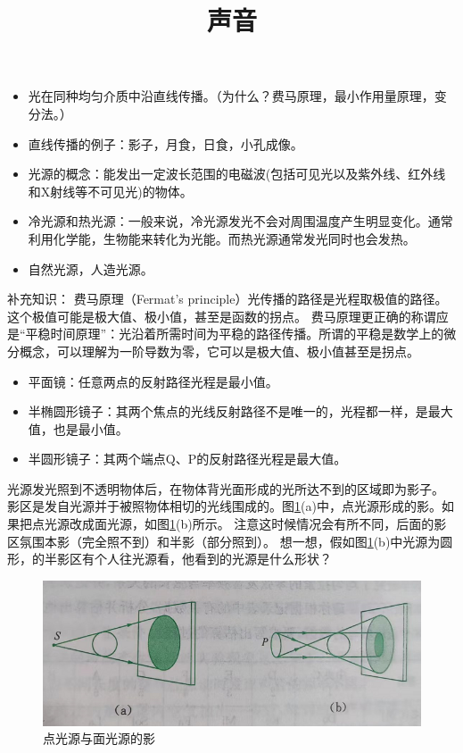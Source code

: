 \documentclass[windows,csize4, answers]{BHCexam}
\title{声音}
\begin{document}
\maketitle

\begin{groups}
    \begin{itemize}
        \item 光在同种均匀介质中沿直线传播。（为什么？费马原理，最小作用量原理，变分法。）
        \item 直线传播的例子：影子，月食，日食，小孔成像。
        \item 光源的概念：能发出一定波长范围的电磁波(包括可见光以及紫外线、红外线和X射线等不可见光)的物体。
        \item 冷光源和热光源：一般来说，冷光源发光不会对周围温度产生明显变化。通常利用化学能，生物能来转化为光能。而热光源通常发光同时也会发热。
        \item 自然光源，人造光源。
    \end{itemize}

    补充知识： 费马原理（Fermat's principle）光传播的路径是光程取极值的路径。这个极值可能是极大值、极小值，甚至是函数的拐点。
    费马原理更正确的称谓应是“平稳时间原理”：光沿着所需时间为平稳的路径传播。所谓的平稳是数学上的微分概念，可以理解为一阶导数为零，它可以是极大值、极小值甚至是拐点。
    \begin{itemize}
        \item 平面镜：任意两点的反射路径光程是最小值。
        \item 半椭圆形镜子：其两个焦点的光线反射路径不是唯一的，光程都一样，是最大值，也是最小值。
        \item 半圆形镜子：其两个端点Q、P的反射路径光程是最大值。
    \end{itemize}

    光源发光照到不透明物体后，在物体背光面形成的光所达不到的区域即为影子。
    影区是发自光源并于被照物体相切的光线围成的。图\ref{fig:fig_3_1}(a)中，点光源形成的影。如果把点光源改成面光源，如图\ref{fig:fig_3_1}(b)所示。
    注意这时候情况会有所不同，后面的影区氛围本影（完全照不到）和半影（部分照到）。
    想一想，假如图\ref{fig:fig_3_1}(b)中光源为圆形，的半影区有个人往光源看，他看到的光源是什么形状？
    \begin{figure}[htb]
        \centering
        \includegraphics [scale=0.75,trim=0 0 0 0]{./image/fig_3_1.PNG}
        \caption{点光源与面光源的影}
        \label{fig:fig_3_1}
    \end{figure}


\end{groups}
\end{document}
